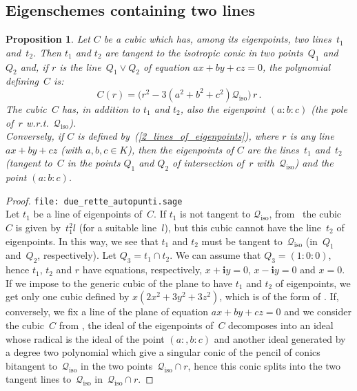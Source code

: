 \documentclass{amsart}
\theoremstyle{plain}
\newtheorem{prop}[lemma]{Proposition}
\theoremstyle{definition}
\newcommand{\iso}{\mathcal{Q}_{\mathrm{iso}}}
\newcommand{\iii}{\textbf{i}}
\begin{document}
\subsection{Eigenschemes containing two lines}
\begin{prop}
\label{cubiche_con_2_rette}
Let $C$ be a cubic which has, among its eigenpoints, two lines~$t_1$
and~$t_2$. Then $t_1$ and $t_2$ are tangent to the isotropic conic
in two points~$Q_1$ and~$Q_2$ and, if $r$ is the line~$Q_1 \vee Q_2$
of equation $ax+by+cz=0$, the polynomial defining~$C$ is:
%
\begin{equation}
\label{2_lines_of_eigenpoints}
  C(r) = \bigl( r^2-3\left(a^2+b^2+c^2\right)\iso \bigr) \, r \,.
\end{equation}
%
The cubic~$C$ has, in addition to $t_1$ and $t_2$, also the eigenpoint $(a: b: c)$
(the pole of~$r$ w.r.t.\ $\iso$). \\
Conversely, if $C$ is defined by~(\ref{2_lines_of_eigenpoints}), where
$r$ is any line $ax+by+cz$ (with $a, b, c \in K$), then
the eigenpoints of $C$ are the lines~$t_1$ and~$t_2$ (tangent to~$C$
in the points $Q_1$ and $Q_2$ of intersection of~$r$ with~$\iso$) and
the point $(a: b: c)$.
\end{prop}
\begin{proof}
\verb+file: due_rette_autopunti.sage+\\
Let $t_1$ be a line of eigenpoints of~$C$. If $t_1$ is not tangent
to $\iso$, from~ the cubic~$C$ is given by~$t_1^2l$ (for
a suitable line~$l$), but this cubic cannot have the line~$t_2$
of eigenpoints.
In this way, we see that $t_1$ and $t_2$ must be tangent to~$\iso$ (in~$Q_1$ and~$Q_2$, respectively). Let $Q_3 = t_1 \cap t_2$. We can assume
that $Q_3 = (1: 0: 0)$, hence $t_1$, $t_2$ and $r$ have equations,
respectively, $x+\iii y=0$, $x-\iii y = 0$ and $x=0$.
If we impose to the generic cubic of the plane to have
$t_1$ and $t_2$ of eigenpoints, we get only one cubic defined by
$x(2x^2 + 3y^2 + 3z^2)$, which is of the
form of . If, conversely, we fix a line
of the plane of equation $ax+by+cz=0$ and we consider the cubic~$C$ from , the ideal of
the eigenpoints of~$C$ decomposes into an ideal whose radical is
the ideal of the point $(a:, b: c)$ and another ideal generated by
a degree two polynomial which give a singular conic of the pencil
of conics bitangent to~$\iso$ in the two points~$\iso \cap r$, hence
this conic splits into the two tangent lines to~$\iso$ in~$\iso \cap r$.
\end{proof}
\end{document}

